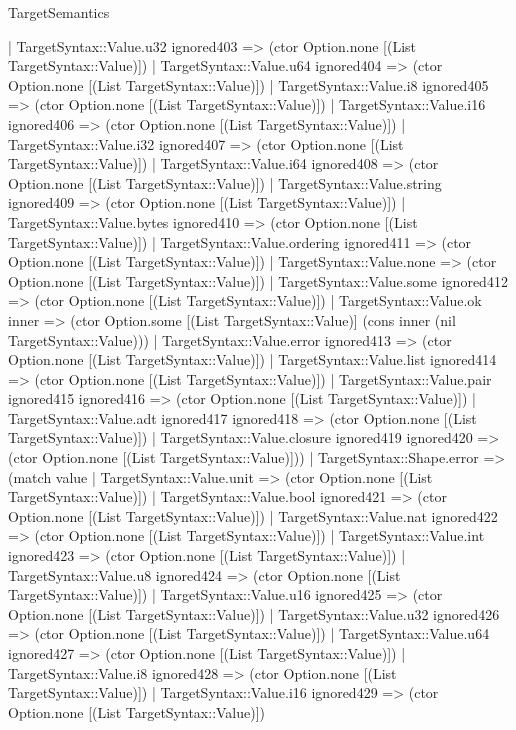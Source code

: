 \begin{lexlean}{TargetSemantics}
\begin{semanticmodule}
{      | TargetSyntax::Value.u32 ignored403 => (ctor Option.none [(List TargetSyntax::Value)])
      | TargetSyntax::Value.u64 ignored404 => (ctor Option.none [(List TargetSyntax::Value)])
      | TargetSyntax::Value.i8 ignored405 => (ctor Option.none [(List TargetSyntax::Value)])
      | TargetSyntax::Value.i16 ignored406 => (ctor Option.none [(List TargetSyntax::Value)])
      | TargetSyntax::Value.i32 ignored407 => (ctor Option.none [(List TargetSyntax::Value)])
      | TargetSyntax::Value.i64 ignored408 => (ctor Option.none [(List TargetSyntax::Value)])
      | TargetSyntax::Value.string ignored409 => (ctor Option.none [(List TargetSyntax::Value)])
      | TargetSyntax::Value.bytes ignored410 => (ctor Option.none [(List TargetSyntax::Value)])
      | TargetSyntax::Value.ordering ignored411 => (ctor Option.none [(List TargetSyntax::Value)])
      | TargetSyntax::Value.none => (ctor Option.none [(List TargetSyntax::Value)])
      | TargetSyntax::Value.some ignored412 => (ctor Option.none [(List TargetSyntax::Value)])
      | TargetSyntax::Value.ok inner => (ctor Option.some [(List TargetSyntax::Value)] (cons inner (nil TargetSyntax::Value)))
      | TargetSyntax::Value.error ignored413 => (ctor Option.none [(List TargetSyntax::Value)])
      | TargetSyntax::Value.list ignored414 => (ctor Option.none [(List TargetSyntax::Value)])
      | TargetSyntax::Value.pair ignored415 ignored416 => (ctor Option.none [(List TargetSyntax::Value)])
      | TargetSyntax::Value.adt ignored417 ignored418 => (ctor Option.none [(List TargetSyntax::Value)])
      | TargetSyntax::Value.closure ignored419 ignored420 => (ctor Option.none [(List TargetSyntax::Value)]))
    | TargetSyntax::Shape.error => (match value
      | TargetSyntax::Value.unit => (ctor Option.none [(List TargetSyntax::Value)])
      | TargetSyntax::Value.bool ignored421 => (ctor Option.none [(List TargetSyntax::Value)])
      | TargetSyntax::Value.nat ignored422 => (ctor Option.none [(List TargetSyntax::Value)])
      | TargetSyntax::Value.int ignored423 => (ctor Option.none [(List TargetSyntax::Value)])
      | TargetSyntax::Value.u8 ignored424 => (ctor Option.none [(List TargetSyntax::Value)])
      | TargetSyntax::Value.u16 ignored425 => (ctor Option.none [(List TargetSyntax::Value)])
      | TargetSyntax::Value.u32 ignored426 => (ctor Option.none [(List TargetSyntax::Value)])
      | TargetSyntax::Value.u64 ignored427 => (ctor Option.none [(List TargetSyntax::Value)])
      | TargetSyntax::Value.i8 ignored428 => (ctor Option.none [(List TargetSyntax::Value)])
      | TargetSyntax::Value.i16 ignored429 => (ctor Option.none [(List TargetSyntax::Value)])
}
\end{semanticmodule}
\end{lexlean}
